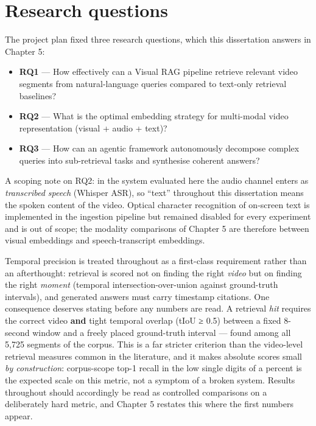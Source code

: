 \section{Research questions}

The project plan fixed three research questions, which this dissertation
answers in Chapter 5:

\begin{itemize}
\tightlist
\item
  \textbf{RQ1} --- How effectively can a Visual RAG pipeline retrieve
  relevant video segments from natural-language queries compared to
  text-only retrieval baselines?
\item
  \textbf{RQ2} --- What is the optimal embedding strategy for
  multi-modal video representation (visual + audio + text)?
\item
  \textbf{RQ3} --- How can an agentic framework autonomously decompose
  complex queries into sub-retrieval tasks and synthesise coherent
  answers?
\end{itemize}

A scoping note on RQ2: in the system evaluated here the audio channel
enters as \emph{transcribed speech} (Whisper ASR), so ``text''
throughout this dissertation means the spoken content of the video.
Optical character recognition of on-screen text is implemented in the
ingestion pipeline but remained disabled for every experiment and is out
of scope; the modality comparisons of Chapter 5 are therefore between
visual embeddings and speech-transcript embeddings.

Temporal precision is treated throughout as a first-class requirement
rather than an afterthought: retrieval is scored not on finding the
right \emph{video} but on finding the right \emph{moment} (temporal
intersection-over-union against ground-truth intervals), and generated
answers must carry timestamp citations. One consequence deserves stating
before any numbers are read. A retrieval \emph{hit} requires the correct
video \textbf{and} tight temporal overlap (tIoU ≥ 0.5) between a fixed
8-second window and a freely placed ground-truth interval --- found
among all 5,725 segments of the corpus. This is a far stricter criterion
than the video-level retrieval measures common in the literature, and it
makes absolute scores small \emph{by construction}: corpus-scope top-1
recall in the low single digits of a percent is the expected scale on
this metric, not a symptom of a broken system. Results throughout should
accordingly be read as controlled comparisons on a deliberately hard
metric, and Chapter 5 restates this where the first numbers appear.

